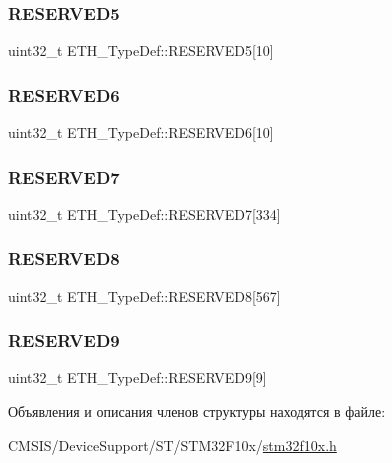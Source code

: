 \subsubsection{\texorpdfstring{RESERVED5}{RESERVED5}}
{\footnotesize\ttfamily uint32\+\_\+t E\+T\+H\+\_\+\+Type\+Def\+::\+R\+E\+S\+E\+R\+V\+E\+D5\mbox{[}10\mbox{]}}

\mbox{\label{struct_e_t_h___type_def_a385c760f26ab4a4f8ce38a956e20d453}} 
\subsubsection{\texorpdfstring{RESERVED6}{RESERVED6}}
{\footnotesize\ttfamily uint32\+\_\+t E\+T\+H\+\_\+\+Type\+Def\+::\+R\+E\+S\+E\+R\+V\+E\+D6\mbox{[}10\mbox{]}}

\mbox{\label{struct_e_t_h___type_def_ad7dff0a9ab65fe6273a8cab3e4152ed3}} 
\subsubsection{\texorpdfstring{RESERVED7}{RESERVED7}}
{\footnotesize\ttfamily uint32\+\_\+t E\+T\+H\+\_\+\+Type\+Def\+::\+R\+E\+S\+E\+R\+V\+E\+D7\mbox{[}334\mbox{]}}

\mbox{\label{struct_e_t_h___type_def_a912e8bfafc581d114dc646952209aa1c}} 
\subsubsection{\texorpdfstring{RESERVED8}{RESERVED8}}
{\footnotesize\ttfamily uint32\+\_\+t E\+T\+H\+\_\+\+Type\+Def\+::\+R\+E\+S\+E\+R\+V\+E\+D8\mbox{[}567\mbox{]}}

\mbox{\label{struct_e_t_h___type_def_a57a4c0f1bc5e8dd706e5951c59d29eb8}} 
\subsubsection{\texorpdfstring{RESERVED9}{RESERVED9}}
{\footnotesize\ttfamily uint32\+\_\+t E\+T\+H\+\_\+\+Type\+Def\+::\+R\+E\+S\+E\+R\+V\+E\+D9\mbox{[}9\mbox{]}}



Объявления и описания членов структуры находятся в файле\+:\begin{DoxyCompactItemize}
\item 
C\+M\+S\+I\+S/\+Device\+Support/\+S\+T/\+S\+T\+M32\+F10x/\mbox{\hyperlink{stm32f10x_8h}{stm32f10x.\+h}}\end{DoxyCompactItemize}
